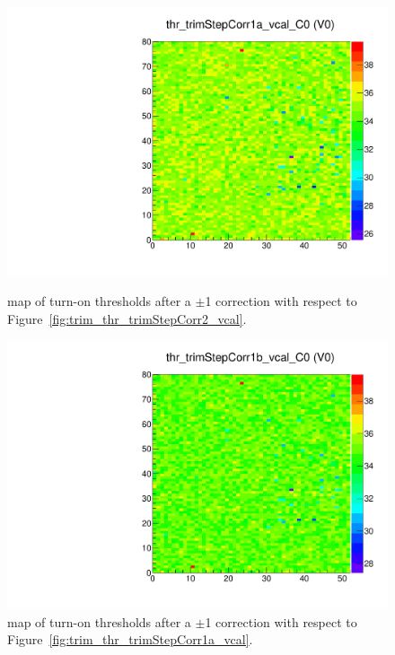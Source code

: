 \begin{figure}[!htp]
\centering
\begin{minipage}{0.45\textwidth}
  \includegraphics[width=1.0\textwidth]{figures/trim_thr_trimStepCorr1a_vcal.pdf}
  \caption{\roc map of \vcal turn-on thresholds after a \trimbits$\pm$1 correction with respect to Figure~\ref{fig:trim_thr_trimStepCorr2_vcal}.}
  \label{fig:trim_thr_trimStepCorr1a_vcal}
\end{minipage}
\hspace{0.3cm}
\begin{minipage}{0.45\textwidth}
  \includegraphics[width=1.0\textwidth]{figures/trim_thr_trimStepCorr1b_vcal.pdf}
  \caption{\roc map of \vcal turn-on thresholds after a \trimbits$\pm$1 correction with respect to Figure~\ref{fig:trim_thr_trimStepCorr1a_vcal}.}
  \label{fig:trim_thr_trimStepCorr1b_vcal}
\end{minipage}
\end{figure}



